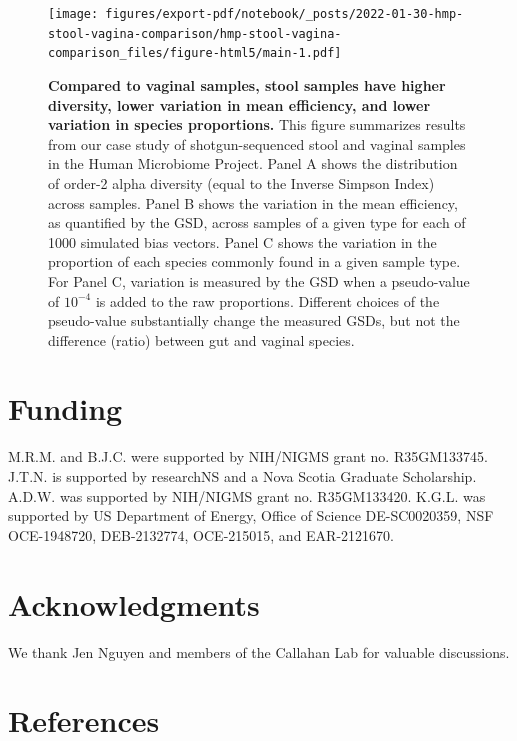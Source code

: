 \documentclass[
]{article}
\begin{document}
\begin{figure}
\centering
\texttt{[image: figures/export-pdf/notebook/\_posts/2022-01-30-hmp-stool-vagina-comparison/hmp-stool-vagina-comparison\_files/figure-html5/main-1.pdf]}
\caption{\label{fig:gut}\textbf{Compared to vaginal samples, stool samples have higher diversity, lower variation in mean efficiency, and lower variation in species proportions.} This figure summarizes results from our case study of shotgun-sequenced stool and vaginal samples in the Human Microbiome Project. Panel A shows the distribution of order-2 alpha diversity (equal to the Inverse Simpson Index) across samples. Panel B shows the variation in the mean efficiency, as quantified by the GSD, across samples of a given type for each of 1000 simulated bias vectors. Panel C shows the variation in the proportion of each species commonly found in a given sample type. For Panel C, variation is measured by the GSD when a pseudo-value of \(10^{-4}\) is added to the raw proportions. Different choices of the pseudo-value substantially change the measured GSDs, but not the difference (ratio) between gut and vaginal species.}
\end{figure}



\clearpage

\hypertarget{funding}{%
\section*{Funding}\label{funding}}

M.R.M. and B.J.C. were supported by NIH/NIGMS grant no. R35GM133745.
J.T.N. is supported by researchNS and a Nova Scotia Graduate Scholarship.
A.D.W. was supported by NIH/NIGMS grant no. R35GM133420.
K.G.L. was supported by US Department of Energy, Office of Science DE-SC0020359, NSF OCE-1948720, DEB-2132774, OCE-215015, and EAR-2121670.

\hypertarget{acknowledgments}{%
\section*{Acknowledgments}\label{acknowledgments}}

We thank Jen Nguyen and members of the Callahan Lab for valuable discussions.

\clearpage

\hypertarget{references}{%
\section*{References}\label{references}}
\end{document}
